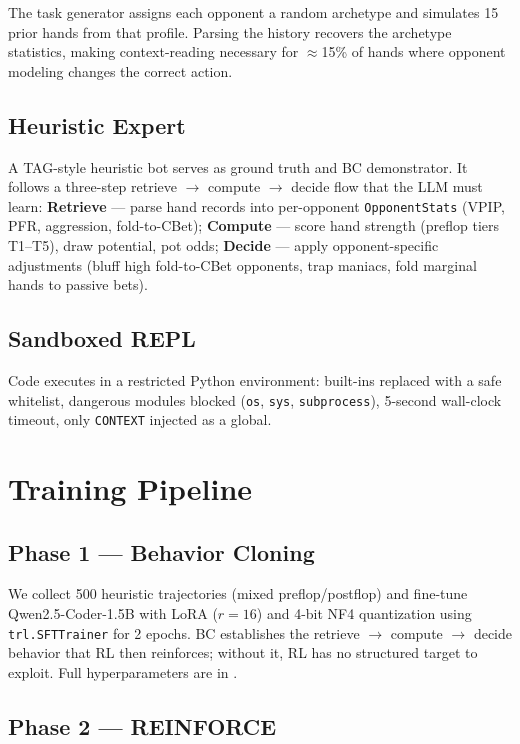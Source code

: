 \documentclass{article}
\begin{document}
The task generator assigns each opponent a random archetype and
simulates 15 prior hands from that profile.
Parsing the history recovers the archetype statistics, making
context-reading necessary for $\approx$15\% of hands where opponent
modeling changes the correct action.

\subsection{Heuristic Expert}

A TAG-style heuristic bot serves as ground truth and BC demonstrator.
It follows a three-step retrieve $\to$ compute $\to$ decide flow that
the LLM must learn:
\textbf{Retrieve} — parse hand records into per-opponent \texttt{OpponentStats}
(VPIP, PFR, aggression, fold-to-CBet);
\textbf{Compute} — score hand strength (preflop tiers T1–T5), draw
potential, pot odds;
\textbf{Decide} — apply opponent-specific adjustments (bluff high
fold-to-CBet opponents, trap maniacs, fold marginal hands to passive bets).

\subsection{Sandboxed REPL}

Code executes in a restricted Python environment: built-ins replaced
with a safe whitelist, dangerous modules blocked
(\texttt{os}, \texttt{sys}, \texttt{subprocess}), 5-second wall-clock
timeout, only \texttt{CONTEXT} injected as a global.

\section{Training Pipeline}

\subsection{Phase 1 — Behavior Cloning}

We collect 500 heuristic trajectories (mixed preflop/postflop) and
fine-tune Qwen2.5-Coder-1.5B with LoRA ($r{=}16$) and 4-bit NF4
quantization using \texttt{trl.SFTTrainer} for 2 epochs.
BC establishes the retrieve $\to$ compute $\to$ decide behavior that RL
then reinforces; without it, RL has no structured target to exploit.
Full hyperparameters are in .

\subsection{Phase 2 — REINFORCE}
\end{document}
